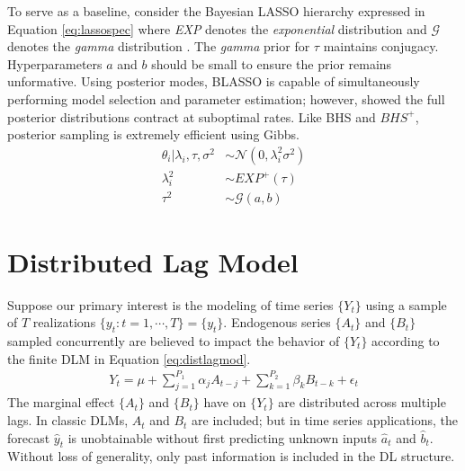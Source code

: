 To serve as a baseline, consider the Bayesian LASSO hierarchy expressed in Equation \ref{eq:lassospec} where \textit{EXP} denotes the \textit{exponential} distribution and $\mathcal{G}$ denotes the \textit{gamma} distribution \citep{Park2008}. The \textit{gamma} prior for $\tau$ maintains conjugacy. Hyperparameters $a$ and $b$ should be small to ensure the prior remains unformative.  Using posterior modes, BLASSO is capable of simultaneously performing model selection and parameter estimation; however, \cite{Castillo2012} showed the full posterior distributions contract at suboptimal rates. Like BHS and $\textit{BHS}^+$, posterior sampling is extremely efficient using Gibbs.
\begin{equation}
\label{eq:lassospec}
\begin{split}
	\theta_i|\lambda_i,\tau,\sigma^2 & \sim \mathcal{N}(0,\lambda^2_i \sigma^2) \\
	\lambda^2_i &\sim \textit{EXP}^+(\tau)\\
	\tau^2 & \sim \mathcal{G}(a,b)
\end{split}
\end{equation}







\bigskip
\section{Distributed Lag Model}
\label{sec:dlm}
Suppose our primary interest is the modeling of time series $\{Y_t\}$ using a sample of $T$ realizations $\{y_t:t=1,\cdots,T\}=\{y_t\}$. Endogenous series $\{A_t\}$ and $\{B_t\}$ sampled concurrently are believed to impact the behavior of $\{Y_t\}$ according to the finite DLM in Equation \ref{eq:distlagmod}. 
\begin{equation}
\label{eq:distlagmod}
\begin{split}
 Y_t=\mu+\sum\limits_{j=1}^{P_1} \alpha_j A_{t-j} +\sum\limits_{k=1}^{P_2} \beta_k B_{t-k}+\epsilon_t 
\end{split}
\end{equation}
The marginal effect $\{A_t\}$ and $\{B_t\}$ have on $\{Y_t\}$ are distributed across multiple lags. In classic DLMs, $A_t$ and $B_t$ are included; but in time series applications, the forecast $\hat{y}_t$ is unobtainable without first predicting unknown inputs $\hat{a}_t$ and $\hat{b}_t$. Without loss of generality, only past information is included in the DL structure.

